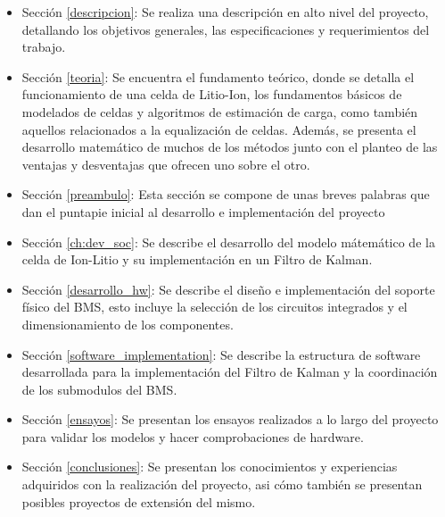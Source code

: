 \documentclass[10pt, a4paper]{report}
\begin{document}
\begin{itemize}
	\item Sección \ref{descripcion}: Se realiza una descripci\'on en alto nivel del proyecto, detallando los objetivos generales, las especificaciones y requerimientos del trabajo.
	\item Sección \ref{teoria}: Se encuentra el fundamento te\'orico, donde se detalla el funcionamiento de una celda de Litio-Ion, los fundamentos b\'asicos de modelados de celdas y algoritmos de estimaci\'on de carga, como tambi\'en aquellos relacionados a la equalizaci\'on de celdas. Adem\'as, se presenta el desarrollo matem\'atico de muchos de los m\'etodos junto con el planteo de las ventajas y desventajas que ofrecen uno sobre el otro.
	\item Sección \ref{preambulo}: Esta sección se compone de unas breves palabras que dan el puntapie inicial al desarrollo e implementación del proyecto
	\item Sección \ref{ch:dev_soc}: Se describe el desarrollo del modelo mátemático de la celda de Ion-Litio y su implementación en un Filtro de Kalman.
	\item Sección \ref{desarrollo_hw}: Se describe el diseño e implementación del soporte físico del BMS, esto incluye  la selección de los circuitos integrados y el dimensionamiento de los componentes.
	\item Sección \ref{software_implementation}: Se describe la estructura de software desarrollada para la implementación del Filtro de Kalman y la coordinación de los submodulos del BMS.
	\item Sección \ref{ensayos}: Se presentan los ensayos realizados a lo largo del proyecto para validar los modelos y hacer comprobaciones de hardware.
	\item Sección \ref{conclusiones}: Se presentan los conocimientos y experiencias adquiridos con la realización del proyecto, asi cómo también se presentan posibles proyectos de extensión del mismo.
\end{itemize}

\end{document}
